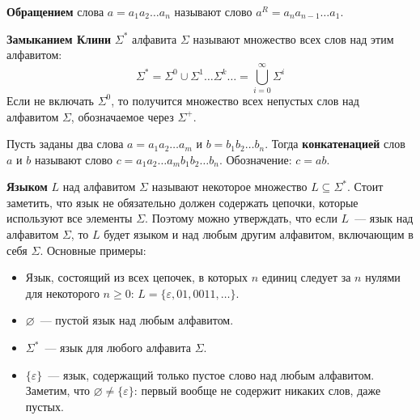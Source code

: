 \documentclass[a4paper,12pt]{article}
\begin{document}
	\textbf{Обращением} слова \(a = a_1 a_2 \ldots a_n\) называют слово \(a^R = a_n a_{n - 1} \ldots a_1\). 
	
	\textbf{Замыканием Клини} \(\Sigma^*\) алфавита \(\Sigma\) называют множество всех слов над этим алфавитом:
	\[\Sigma^* = \Sigma^0 \cup \Sigma^1 \ldots \Sigma^k \ldots = \bigcup_{i = 0}^{\infty} \Sigma^i\]
	Если не включать \(\Sigma^0\), то получится множество всех непустых слов над алфавитом \(\Sigma\), обозначаемое через \(\Sigma^+\).
	
	Пусть заданы два слова \(a = a_1 a_2 \ldots a_m\) и \(b = b_1 b_2 \ldots b_n\). Тогда \textbf{конкатенацией} слов \(a\) и \(b\) называют слово \(c = a_1 a_2 \ldots a_m b_1 b_2 \ldots b_n\). Обозначение: \(c = ab\).
	
	\textbf{Языком} \(L\) над алфавитом \(\Sigma\) называют некоторое множество \(L \subseteq \Sigma^*\). Стоит заметить, что язык не обязательно должен содержать цепочки, которые используют все элементы \(\Sigma\). Поэтому можно утверждать, что если \(L\)~--- язык над алфавитом \(\Sigma\), то \(L\) будет языком и над любым другим алфавитом, включающим в себя \(\Sigma\). Основные примеры:
	\begin{itemize}
		\item Язык, состоящий из всех цепочек, в которых \(n\) единиц следует за \(n\) нулями для некоторого \(n \geqslant 0\): \(L = \{\varepsilon, 01, 0011, \ldots\}\).
		\item \(\varnothing\)~--- пустой язык над любым алфавитом.
		\item \(\Sigma^*\)~--- язык для любого алфавита \(\Sigma\).
		\item \(\{\varepsilon\}\)~--- язык, содержащий только пустое слово над любым алфавитом. Заметим, что \(\varnothing \neq \{\varepsilon\}\): первый вообще не содержит никаких слов, даже пустых.
	\end{itemize}

	
\end{document}
